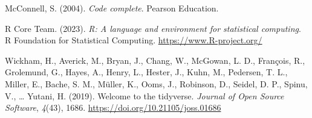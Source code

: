 \documentclass[10pt,a4paper,onecolumn]{article}
\newlength{\cslhangindent}
\newlength{\cslentryspacingunit} %
\newenvironment{CSLReferences}[2] %
 {%
  \setlength{\parindent}{0pt}
  \ifodd #1
  \let\oldpar\par
  \def\par{\hangindent=\cslhangindent\oldpar}
  \fi
  \setlength{\parskip}{#2\cslentryspacingunit}
 }%
 {}
\begin{document}
\hypertarget{refs}{}
\begin{CSLReferences}{1}{0}
\leavevmode{}%
McConnell, S. (2004). \emph{Code complete}. Pearson Education.

\leavevmode{}%
R Core Team. (2023). \emph{{R}: A language and environment for
statistical computing}. R Foundation for Statistical Computing.
\url{https://www.R-project.org/}

\leavevmode{}%
Wickham, H., Averick, M., Bryan, J., Chang, W., McGowan, L. D.,
François, R., Grolemund, G., Hayes, A., Henry, L., Hester, J., Kuhn, M.,
Pedersen, T. L., Miller, E., Bache, S. M., Müller, K., Ooms, J.,
Robinson, D., Seidel, D. P., Spinu, V., \ldots{} Yutani, H. (2019).
Welcome to the {tidyverse}. \emph{Journal of Open Source Software},
\emph{4}(43), 1686. \url{https://doi.org/10.21105/joss.01686}

\end{CSLReferences}
\end{document}
